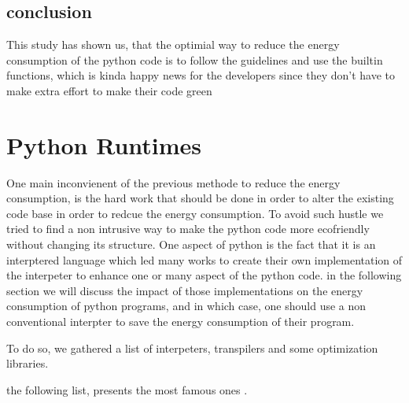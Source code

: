 \subsection{conclusion}
This study has shown us, that the optimial way to reduce the energy consumption of the python code is to follow the guidelines and use the builtin functions, which is kinda happy news for the developers since they don't have to make extra effort to make their code green

\newpage
\section{Python Runtimes}
One main inconvienent of the previous methode to reduce the energy consumption, is the hard work that should be done in order to alter the existing code base in order to redcue the energy consumption. To avoid such hustle we tried to find a non intrusive way to make the python code more ecofriendly without changing its structure. One aspect of python is the fact that it is an interptered language which led many works to create their own implementation of the interpeter to enhance one or many aspect of the python code. in the following section we will discuss the impact of those implementations on the energy consumption of python programs, and in which case, one should use a non conventional interpter to save the energy consumption of their program.

To do so, we gathered a list of interpeters, transpilers and some optimization libraries.

the following list, presents the most famous ones .


